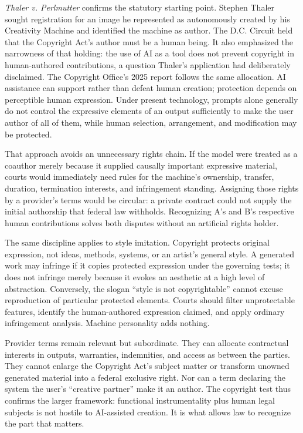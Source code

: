 \emph{Thaler v. Perlmutter} confirms the statutory starting point. Stephen Thaler sought registration for an image he represented as autonomously created by his Creativity Machine and identified the machine as author. The D.C. Circuit held that the Copyright Act's author must be a human being. It also emphasized the narrowness of that holding: the use of AI as a tool does not prevent copyright in human-authored contributions, a question Thaler's application had deliberately disclaimed. The Copyright Office's 2025 report follows the same allocation. AI assistance can support rather than defeat human creation; protection depends on perceptible human expression. Under present technology, prompts alone generally do not control the expressive elements of an output sufficiently to make the user author of all of them, while human selection, arrangement, and modification may be protected.

That approach avoids an unnecessary rights chain. If the model were treated as a coauthor merely because it supplied causally important expressive material, courts would immediately need rules for the machine's ownership, transfer, duration, termination interests, and infringement standing. Assigning those rights by a provider's terms would be circular: a private contract could not supply the initial authorship that federal law withholds. Recognizing A's and B's respective human contributions solves both disputes without an artificial rights holder.

The same discipline applies to style imitation. Copyright protects original expression, not ideas, methods, systems, or an artist's general style. A generated work may infringe if it copies protected expression under the governing tests; it does not infringe merely because it evokes an aesthetic at a high level of abstraction. Conversely, the slogan ``style is not copyrightable'' cannot excuse reproduction of particular protected elements. Courts should filter unprotectable features, identify the human-authored expression claimed, and apply ordinary infringement analysis. Machine personality adds nothing.

Provider terms remain relevant but subordinate. They can allocate contractual interests in outputs, warranties, indemnities, and access as between the parties. They cannot enlarge the Copyright Act's subject matter or transform unowned generated material into a federal exclusive right. Nor can a term declaring the system the user's ``creative partner'' make it an author. The copyright test thus confirms the larger framework: functional instrumentality plus human legal subjects is not hostile to AI-assisted creation. It is what allows law to recognize the part that matters.

